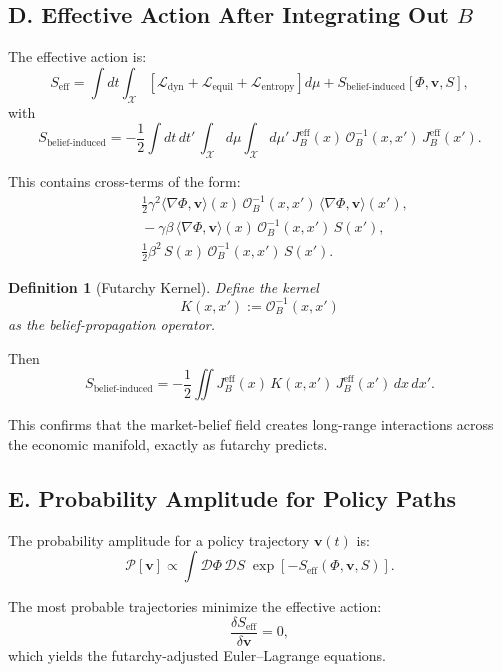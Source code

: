 \documentclass[12pt]{article}
\newtheorem{definition}{Definition}
\begin{document}
\subsection*{D. Effective Action After Integrating Out $B$}

The effective action is:
\[
S_{\text{eff}}
=
\int dt \int_{\mathcal{X}}
\left[
\mathcal{L}_{\text{dyn}}
+
\mathcal{L}_{\text{equil}}
+
\mathcal{L}_{\text{entropy}}
\right] d\mu
+
S_{\text{belief-induced}}[\Phi,\mathbf{v},S],
\]
with
\[
S_{\text{belief-induced}}
=
- \frac{1}{2}
\int dt\,dt'\,\int_{\mathcal{X}}d\mu\int_{\mathcal{X}}d\mu'
\,
J_B^{\text{eff}}(x)
\,
\mathcal{O}_B^{-1}(x,x')
\,
J_B^{\text{eff}}(x').
\]

This contains cross-terms of the form:
\begin{align}
&\phantom{{}={}}
\frac{1}{2}\gamma^2
\langle \nabla\Phi,\mathbf{v}\rangle(x)
\,\mathcal{O}_B^{-1}(x,x')\,
\langle \nabla\Phi,\mathbf{v}\rangle(x'),\\
&\phantom{{}={}}
- \gamma \beta\,
\langle \nabla\Phi,\mathbf{v}\rangle(x)
\,\mathcal{O}_B^{-1}(x,x')\,
S(x'),\\
&\phantom{{}={}}
\frac{1}{2}\beta^2\,
S(x)\,\mathcal{O}_B^{-1}(x,x')\,S(x').
\end{align}

\begin{definition}[Futarchy Kernel]
Define the kernel
\[
K(x,x') := \mathcal{O}_B^{-1}(x,x')
\]
as the belief-propagation operator.
\end{definition}

Then
\[
S_{\text{belief-induced}}
=
- \frac{1}{2}
\iint
J_B^{\text{eff}}(x)
\,K(x,x')\,
J_B^{\text{eff}}(x')
\,dx\,dx'.
\]

This confirms that the market-belief field creates long-range
interactions across the economic manifold, exactly as futarchy
predicts.

\subsection*{E. Probability Amplitude for Policy Paths}

The probability amplitude for a policy trajectory $\mathbf{v}(t)$ is:
\[
\mathcal{P}[\mathbf{v}]
\propto
\int
\mathcal{D}\Phi\,\mathcal{D}S
\;
\exp[-S_{\text{eff}}(\Phi,\mathbf{v},S)].
\]

The most probable trajectories minimize the effective action:
\[
\frac{\delta S_{\text{eff}}}{\delta \mathbf{v}} = 0,
\]
which yields the futarchy-adjusted Euler–Lagrange equations.
\end{document}
